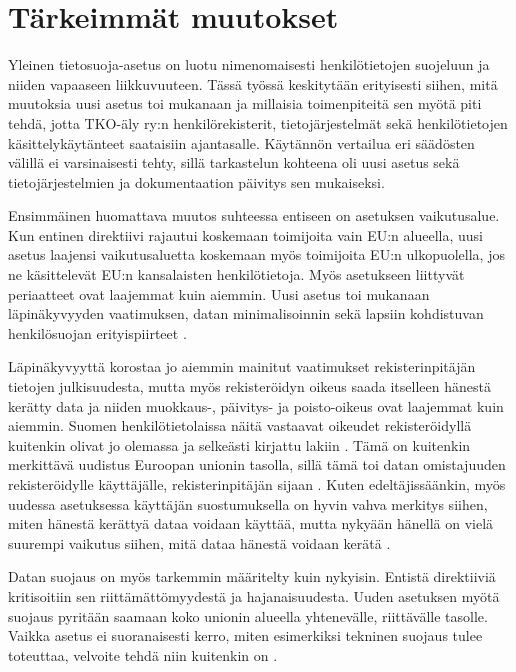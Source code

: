 \documentclass[finnish]{tktltiki}
\begin{document}
\newpage
\section{Tärkeimmät muutokset}

Yleinen tietosuoja-asetus on luotu nimenomaisesti henkilötietojen suojeluun ja niiden vapaaseen liikkuvuuteen. Tässä työssä keskitytään erityisesti siihen, mitä muutoksia uusi asetus toi mukanaan ja millaisia toimenpiteitä sen myötä piti tehdä, jotta TKO-äly ry:n henkilörekisterit, tietojärjestelmät sekä henkilötietojen käsittelykäytänteet saataisiin ajantasalle. Käytännön vertailua eri säädösten välillä ei varsinaisesti tehty, sillä tarkastelun kohteena oli uusi asetus sekä tietojärjestelmien ja dokumentaation päivitys sen mukaiseksi.

Ensimmäinen huomattava muutos suhteessa entiseen on asetuksen vaikutusalue. Kun entinen direktiivi rajautui koskemaan toimijoita vain EU:n alueella, uusi asetus laajensi vaikutusaluetta koskemaan myös toimijoita EU:n ulkopuolella, jos ne käsittelevät EU:n kansalaisten henkilötietoja. Myös asetukseen liittyvät periaatteet ovat laajemmat kuin aiemmin. Uusi asetus toi mukanaan läpinäkyvyyden vaatimuksen, datan minimalisoinnin sekä lapsiin kohdistuvan henkilösuojan erityispiirteet \cite{eu2016,tikkinen}.

Läpinäkyvyyttä korostaa jo aiemmin mainitut vaatimukset rekisterinpitäjän tietojen julkisuudesta, mutta myös rekisteröidyn oikeus saada itselleen hänestä kerätty data ja niiden muokkaus-, päivitys- ja poisto-oikeus ovat laajemmat kuin aiemmin. Suomen henkilötietolaissa näitä vastaavat oikeudet rekisteröidyllä kuitenkin olivat jo olemassa ja selkeästi kirjattu lakiin \cite{henkilotieto}. Tämä on kuitenkin merkittävä uudistus Euroopan unionin tasolla, sillä tämä toi datan omistajuuden rekisteröidylle käyttäjälle, rekisterinpitäjän sijaan \cite{eu2016}. Kuten edeltäjissäänkin, myös uudessa asetuksessa käyttäjän suostumuksella on hyvin vahva merkitys siihen, miten hänestä kerättyä dataa voidaan käyttää, mutta nykyään hänellä on vielä suurempi vaikutus siihen, mitä dataa hänestä voidaan kerätä \cite{eu2016,rikke}.

Datan suojaus on myös tarkemmin määritelty kuin nykyisin. Entistä direktiiviä kritisoitiin sen riittämättömyydestä ja hajanaisuudesta. Uuden asetuksen myötä suojaus pyritään saamaan koko unionin alueella yhtenevälle, riittävälle tasolle. Vaikka asetus ei suoranaisesti kerro, miten esimerkiksi tekninen suojaus tulee toteuttaa, velvoite tehdä niin kuitenkin on \cite{eu2016,barb,tikkinen}.
\end{document}
